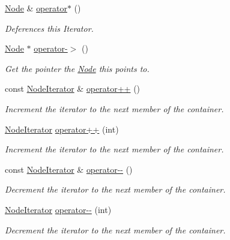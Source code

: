 \begin{DoxyCompactItemize}
\hyperlink{classphys_1_1xml_1_1Node}{Node} \& \hyperlink{classphys_1_1xml_1_1NodeIterator_a3af8dd5a0b7b4c42cad57589ae3feb48}{operator$\ast$} ()
\begin{DoxyCompactList}\small\item\em Deferences this Iterator. \item\end{DoxyCompactList}\item 
\hyperlink{classphys_1_1xml_1_1Node}{Node} $\ast$ \hyperlink{classphys_1_1xml_1_1NodeIterator_a32b9af9cfa38f9ffe5d9243b9c0565cb}{operator-\/$>$} ()
\begin{DoxyCompactList}\small\item\em Get the pointer the \hyperlink{classphys_1_1xml_1_1Node}{Node} this points to. \item\end{DoxyCompactList}\item 
\hypertarget{classphys_1_1xml_1_1NodeIterator_afeef29c3850b37585507873a2a076d8c}{
const \hyperlink{classphys_1_1xml_1_1NodeIterator}{NodeIterator} \& \hyperlink{classphys_1_1xml_1_1NodeIterator_afeef29c3850b37585507873a2a076d8c}{operator++} ()}
\label{da/d4f/classphys_1_1xml_1_1NodeIterator_afeef29c3850b37585507873a2a076d8c}

\begin{DoxyCompactList}\small\item\em Increment the iterator to the next member of the container. \item\end{DoxyCompactList}\item 
\hyperlink{classphys_1_1xml_1_1NodeIterator}{NodeIterator} \hyperlink{classphys_1_1xml_1_1NodeIterator_a3c0b341d6b90e9607bb6b3ae8f6dbfbf}{operator++} (int)
\begin{DoxyCompactList}\small\item\em Increment the iterator to the next member of the container. \item\end{DoxyCompactList}\item 
const \hyperlink{classphys_1_1xml_1_1NodeIterator}{NodeIterator} \& \hyperlink{classphys_1_1xml_1_1NodeIterator_a97d315fce355d0c48322172d248a5138}{operator-\/-\/} ()
\begin{DoxyCompactList}\small\item\em Decrement the iterator to the next member of the container. \item\end{DoxyCompactList}\item 
\hyperlink{classphys_1_1xml_1_1NodeIterator}{NodeIterator} \hyperlink{classphys_1_1xml_1_1NodeIterator_a331a62c9765a66cc9659c75fb58f7ad8}{operator-\/-\/} (int)
\begin{DoxyCompactList}\small\item\em Decrement the iterator to the next member of the container. \item\end{DoxyCompactList}\end{DoxyCompactItemize}
